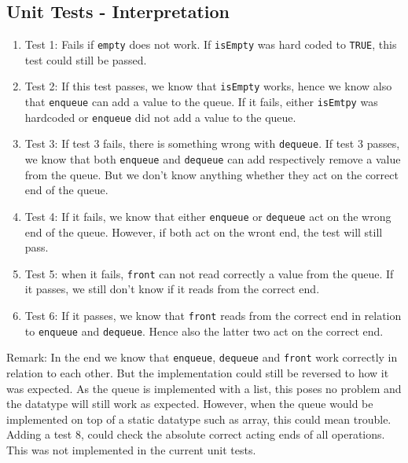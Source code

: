 \documentclass[a4paper,11pt,twoside]{article}
\begin{document}
\subsection{Unit Tests - Interpretation}
\begin{enumerate}
\item Test 1: Fails if \texttt{empty} does not work. If
  \texttt{isEmpty} was hard coded to \texttt{TRUE}, this test could
  still be passed.

\item Test 2: If this test passes, we know that \texttt{isEmpty}
  works, hence we know also that \texttt{enqueue} can add a value to
  the queue. If it fails, either \texttt{isEmtpy} was hardcoded or
  \texttt{enqueue} did not add a value to the queue.

\item Test 3: If test 3 fails, there is something wrong with
  \texttt{dequeue}. If test 3 passes, we know that both
  \texttt{enqueue} and \texttt{dequeue} can add respectively remove a
  value from the queue. But we don't know anything whether they act on
  the correct end of the queue.

\item Test 4: If it fails, we know that either \texttt{enqueue} or
  \texttt{dequeue} act on the wrong end of the queue. However, if both
  act on the wront end, the test will still pass.

\item Test 5: when it fails, \texttt{front} can not read correctly a
  value from the queue. If it passes, we still don't know if it reads from the
  correct end.

\item Test 6: If it passes, we know that \texttt{front} reads
  from the correct end in relation to \texttt{enqueue} and
  \texttt{dequeue}. Hence also the latter two act on the correct end.
\end{enumerate}

Remark: In the end we know that \texttt{enqueue}, \texttt{dequeue} and
\texttt{front} work correctly in relation to each other. But the
implementation could still be reversed to how it was expected. As
the queue is implemented with a list, this poses no problem and the
datatype will still work as expected. However, when the queue would be
implemented on top of a static datatype such as array, this could mean
trouble. Adding a test 8, could check the absolute correct acting ends
of all operations. This was not implemented in the current unit tests.
 
\end{document}
